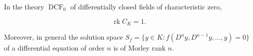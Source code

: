 In the theory $\operatorname{DCF}_0$ of differentially closed fields of characteristic zero,

$$\operatorname{rk} C_K = 1.$$

Moreover, in general the solution space $S_f = \{y \in K : f(D^n y, D^{n-1} y, \ldots, y) = 0\}$ of a differential equation of order $n$ is of Morley rank $n$.
